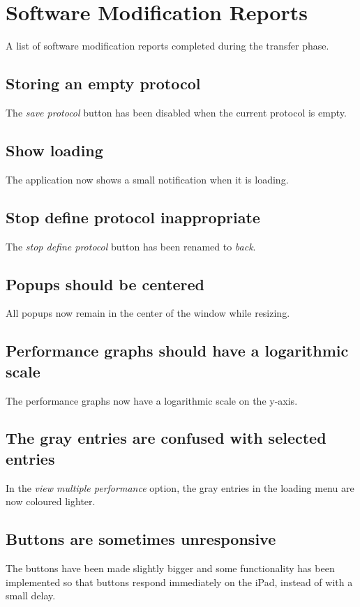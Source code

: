 \chapter{Software Modification Reports}
\label{chap:implemented}
A list of software modification reports completed during the transfer phase. 

\section*{Storing an empty protocol}
The \emph{save protocol} button has been disabled when the current protocol is empty.

\section*{Show loading}
The application now shows a small notification when it is loading.

\section*{Stop define protocol inappropriate}
The \emph{stop define protocol} button has been renamed to \emph{back}.

\section*{Popups should be centered}
All popups now remain in the center of the window while resizing.

\section*{Performance graphs should have a logarithmic scale}
The performance graphs now have a logarithmic scale on the y-axis.

\section*{The gray entries are confused with selected entries}
In the \emph{view multiple performance} option, the gray entries in the loading menu are now coloured lighter.

\section*{Buttons are sometimes unresponsive}
The buttons have been made slightly bigger and some functionality has been implemented so that buttons respond immediately on the iPad, instead of with a small delay.

